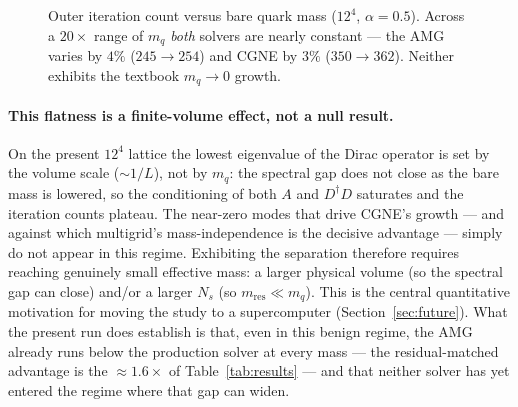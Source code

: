 \documentclass[12pt,a4paper]{article}
\newcommand{\Ddw}{D}
\newcommand{\Aop}{A}
\newcommand{\dg}{^{\dagger}}
\begin{document}
\begin{figure}[h]
\centering
{}
\caption{Outer iteration count versus bare quark mass ($12^4$, $\alpha=0.5$). Across
a $20\times$ range of $m_q$ \emph{both} solvers are nearly constant --- the AMG
varies by $4\%$ ($245\!\to\!254$) and CGNE by $3\%$ ($350\!\to\!362$). Neither
exhibits the textbook $m_q\to0$ growth.}
\label{fig:massscan}
\end{figure}

\paragraph{This flatness is a finite-volume effect, not a null result.}
On the present $12^4$ lattice the lowest eigenvalue of the Dirac operator is set by
the volume scale ($\sim\!1/L$), not by $m_q$: the spectral gap does not close as the
bare mass is lowered, so the conditioning of both $\Aop$ and $\Ddw\dg\Ddw$
saturates and the iteration counts plateau. The near-zero modes that drive CGNE's growth --- and against which
multigrid's mass-independence is the decisive advantage --- simply do not appear in
this regime. Exhibiting the separation therefore requires reaching genuinely small
effective mass: a larger physical volume (so the spectral gap can close) and/or a
larger $N_s$ (so $m_{\mathrm{res}}\ll m_q$). This is the central quantitative
motivation for moving the study to a supercomputer (Section~\ref{sec:future}). What
the present run does establish is that, even in this benign regime, the AMG already
runs below the production solver at every mass --- the residual-matched advantage is
the $\approx\!1.6\times$ of Table~\ref{tab:results} --- and that neither solver has
yet entered the regime where that gap can widen.
\end{document}
